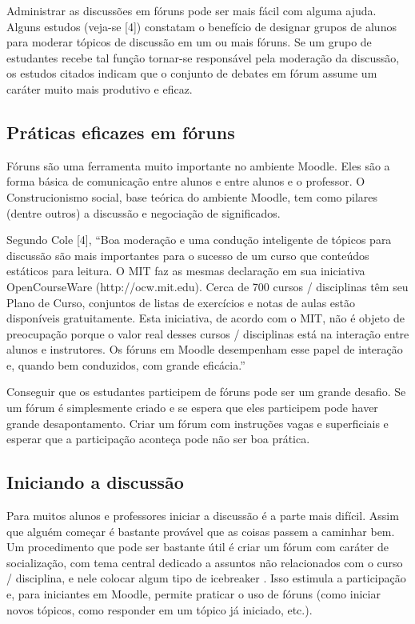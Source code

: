 Administrar as discussões em fóruns pode ser mais fácil com alguma ajuda. Alguns estudos (veja-se [4]) constatam o benefício de designar grupos de alunos para moderar tópicos de discussão em um ou mais fóruns. Se um grupo de estudantes recebe tal função tornar-se responsável pela moderação da discussão, os estudos citados indicam que o conjunto de debates em fórum assume um caráter muito mais produtivo e eficaz.

\subsection{Práticas eficazes em fóruns}
Fóruns são uma ferramenta muito importante no ambiente Moodle. Eles são a forma básica de comunicação entre alunos e entre alunos e o professor. O Construcionismo social, base teórica do ambiente Moodle, tem como pilares (dentre outros) a discussão e negociação de significados.

Segundo Cole [4], “Boa moderação e uma condução inteligente de tópicos para discussão são mais importantes para o sucesso de um curso que conteúdos estáticos para leitura. O MIT  faz as mesmas declaração em sua iniciativa OpenCourseWare (http://ocw.mit.edu). Cerca de 700 cursos / disciplinas têm seu Plano de Curso, conjuntos de listas de exercícios e notas de aulas estão disponíveis gratuitamente. Esta iniciativa, de acordo com o MIT, não é objeto de preocupação porque o valor real desses cursos / disciplinas está na interação entre alunos e instrutores. Os fóruns em Moodle desempenham esse papel de interação e, quando bem conduzidos, com grande eficácia.”

Conseguir que os estudantes participem de fóruns pode ser um grande desafio. Se um fórum é simplesmente criado e se espera que eles participem pode haver grande desapontamento. Criar um fórum com instruções vagas e superficiais e esperar que a participação aconteça pode não ser boa prática.

\subsection{Iniciando a discussão}
Para muitos alunos e professores iniciar a discussão é a parte mais difícil. Assim que alguém começar é bastante provável que as coisas passem a caminhar bem. Um procedimento que pode ser bastante útil é criar um fórum com caráter de socialização, com tema central dedicado a assuntos não relacionados com o curso / disciplina, e nele colocar algum tipo de icebreaker . Isso estimula a participação e, para iniciantes em Moodle, permite praticar o uso de fóruns (como iniciar novos tópicos, como responder em um tópico já iniciado, etc.).
